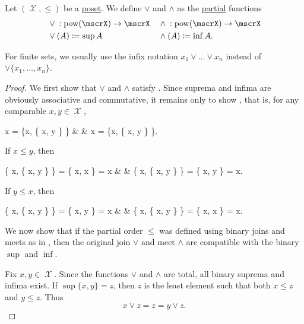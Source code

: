 \begin{definition}\label{def:lattice_operations}
  Let \( (\mscrX, \leq) \) be a \hyperref[def:poset]{poset}. We define  \( \vee \) and  \( \wedge \) as the \hyperref[def:function/partial]{partial} functions
  \begin{align*}
    &{}\vee{}: \Pow(\mscrX) \to \mscrX
    &&{}\wedge{}: \Pow(\mscrX) \to \mscrX
    \\
    & \vee(A) \coloneqq \sup A
    && \wedge(A) \coloneqq \inf A.
  \end{align*}

  For finite sets, we usually use the infix notation \( x_1 \vee \ldots \vee x_n \) instead of \( \vee \{ x_1, \ldots, x_n \} \).
\end{definition}
\begin{proof}
  We first show that \( \vee \) and \( \wedge \) satisfy . Since suprema and infima are obviously associative and commutative, it remains only to show , that is, for any comparable \( x, y \in \mscrX \),
  \begin{BreakableAlign*}
    x = \sup \{x, \inf \{ x, y \} \}
     &  &
    x = \inf \{x, \sup \{ x, y \} \}.
  \end{BreakableAlign*}

  If \( x \leq y \), then
  \begin{BreakableAlign*}
    \sup \{ x, \inf \{ x, y \} \} = \sup \{ x, x \} = x
     &  &
    \inf \{ x, \sup \{ x, y \} \} = \inf \{ x, y \} = x.
  \end{BreakableAlign*}

  If \( y \leq x \), then
  \begin{BreakableAlign*}
    \sup \{ x, \inf \{ x, y \} \} = \sup \{ x, y \} = x
     &  &
    \inf \{ x, \sup \{ x, y \} \} = \inf \{ x, x \} = x.
  \end{BreakableAlign*}

  We now show that if the partial order \( \leq \) was defined using binary joins and meets as in , then the original join \( \vee \) and meet \( \wedge \) are compatible with the binary \( \sup \) and \( \inf \).

  Fix \( x, y \in \mscrX \). Since the functions \( \vee \) and \( \wedge \) are total, all binary suprema and infima exist. If \( \sup \{ x, y \} = z \), then \( z \) is the least element such that both \( x \leq z \) and \( y \leq z \). Thus
  \begin{equation*}
    x \vee z = z = y \vee z.
  \end{equation*}


\end{proof}
